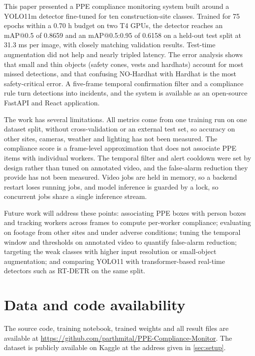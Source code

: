\documentclass[preprint,12pt]{elsarticle}
\begin{document}
This paper presented a PPE compliance monitoring system built around a YOLO11m detector fine-tuned for ten construction-site classes. Trained for 75 epochs within a 0.70 h budget on two T4 GPUs, the detector reaches an mAP@0.5 of 0.8659 and an mAP@0.5:0.95 of 0.6158 on a held-out test split at 31.3 ms per image, with closely matching validation results. Test-time augmentation did not help and nearly tripled latency. The error analysis shows that small and thin objects (safety cones, vests and hardhats) account for most missed detections, and that confusing NO-Hardhat with Hardhat is the most safety-critical error. A five-frame temporal confirmation filter and a compliance rule turn detections into incidents, and the system is available as an open-source FastAPI and React application.

The work has several limitations. All metrics come from one training run on one dataset split, without cross-validation or an external test set, so accuracy on other sites, cameras, weather and lighting has not been measured. The compliance score is a frame-level approximation that does not associate PPE items with individual workers. The temporal filter and alert cooldown were set by design rather than tuned on annotated video, and the false-alarm reduction they provide has not been measured. Video jobs are held in memory, so a backend restart loses running jobs, and model inference is guarded by a lock, so concurrent jobs share a single inference stream.

Future work will address these points: associating PPE boxes with person boxes and tracking workers across frames to compute per-worker compliance; evaluating on footage from other sites and under adverse conditions; tuning the temporal window and thresholds on annotated video to quantify false-alarm reduction; targeting the weak classes with higher input resolution or small-object augmentation; and comparing YOLO11 with transformer-based real-time detectors such as RT-DETR \cite{zhao2024rtdetr} on the same split.

\section*{Data and code availability}

The source code, training notebook, trained weights and all result files are available at \url{https://github.com/parthmital/PPE-Compliance-Monitor}. The dataset is publicly available on Kaggle at the address given in \cref{sec:setup}.
\end{document}
